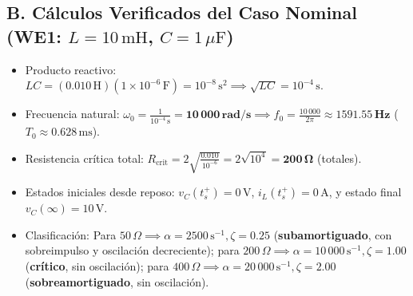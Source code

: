 \documentclass[11pt, a4paper]{article}
\begin{document}
\subsection*{B. Cálculos Verificados del Caso Nominal (WE1: $L=10\,\text{mH}$, $C=1\,\mu\text{F}$)}
\begin{itemize}\setlength\itemsep{0.1cm}
    \item Producto reactivo: $LC = (0.010\,\text{H})(1\times 10^{-6}\,\text{F}) = 10^{-8}\,\text{s}^2 \implies \sqrt{LC} = 10^{-4}\,\text{s}$.
    \item Frecuencia natural: $\omega_0 = \frac{1}{10^{-4}\,\text{s}} = \mathbf{10\,000\,\text{rad/s}} \implies f_0 = \frac{10\,000}{2\pi} \approx \mathbf{1591.55\,\text{Hz}}$ ($T_0 \approx 0.628\,\text{ms}$).
    \item Resistencia crítica total: $R_{\text{crit}} = 2\sqrt{\frac{0.010}{10^{-6}}} = 2\sqrt{10^4} = \mathbf{200\,\Omega}$ (totales).
    \item Estados iniciales desde reposo: $v_C(t_s^+)=0\,\text{V}$, $i_L(t_s^+)=0\,\text{A}$, y estado final $v_C(\infty)=10\,\text{V}$.
    \item Clasificación: Para $50\,\Omega \implies \alpha=2500\,\text{s}^{-1}, \zeta=0.25$ (\textbf{subamortiguado}, con sobreimpulso y oscilación decreciente); para $200\,\Omega \implies \alpha=10\,000\,\text{s}^{-1}, \zeta=1.00$ (\textbf{crítico}, sin oscilación); para $400\,\Omega \implies \alpha=20\,000\,\text{s}^{-1}, \zeta=2.00$ (\textbf{sobreamortiguado}, sin oscilación).
\end{itemize}
\end{document}
